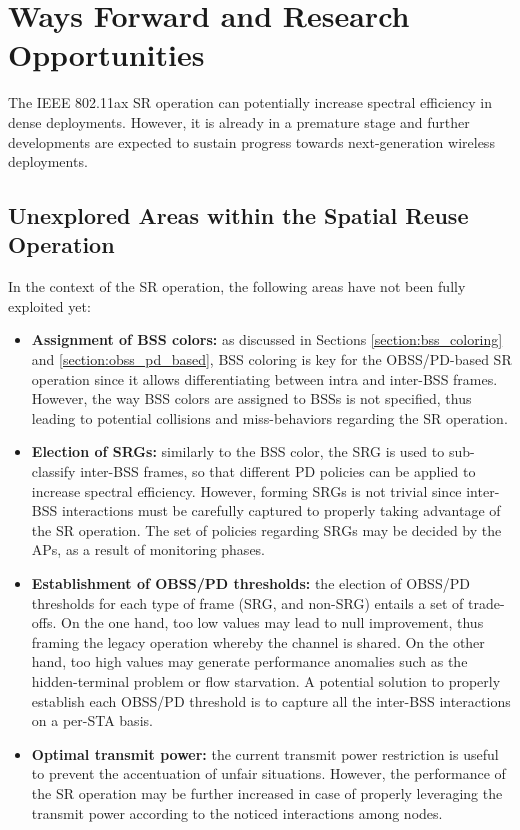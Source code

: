 \documentclass{ieeeaccess}
\begin{document}
\section{Ways Forward and Research Opportunities}
\label{section:ways_forwad}
The IEEE 802.11ax SR operation can potentially increase spectral efficiency in dense deployments. However, it is already in a premature stage and further developments are expected to sustain progress towards next-generation wireless deployments. 

\subsection{Unexplored Areas within the Spatial Reuse Operation}
In the context of the SR operation, the following areas have not been fully exploited yet:
\begin{itemize}
	\item \textbf{Assignment of BSS colors:} as discussed in Sections \ref{section:bss_coloring} and \ref{section:obss_pd_based}, BSS coloring is key for the OBSS/PD-based SR operation since it allows differentiating between intra and inter-BSS frames. However, the way BSS colors are assigned to BSSs is not specified, thus leading to potential collisions and miss-behaviors regarding the SR operation.
	\item \textbf{Election of SRGs:} similarly to the BSS color, the SRG is used to sub-classify inter-BSS frames, so that different PD policies can be applied to increase spectral efficiency. However, forming SRGs is not trivial since inter-BSS interactions must be carefully captured to properly taking advantage of the SR operation. The set of policies regarding SRGs may be decided by the APs, as a result of monitoring phases.%
	\item \textbf{Establishment of OBSS/PD thresholds:} the election of OBSS/PD thresholds for each type of frame (SRG, and non-SRG) entails a set of trade-offs. On the one hand, too low values may lead to null improvement, thus framing the legacy operation whereby the channel is shared. On the other hand, too high values may generate performance anomalies such as the hidden-terminal problem or flow starvation. A potential solution to properly establish each OBSS/PD threshold is to capture all the inter-BSS interactions on a per-STA basis.
	\item \textbf{Optimal transmit power:} the current transmit power restriction is useful to prevent the accentuation of unfair situations. However, the performance of the SR operation may be further increased in case of properly leveraging the transmit power according to the noticed interactions among nodes.

\end{itemize}
\end{document}
